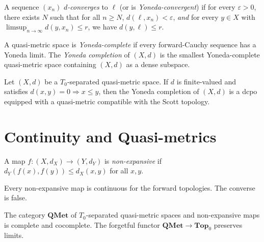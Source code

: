 \begin{definition}
A sequence $(x_n)$ \emph{$d$-converges} to $\ell$ (or is \emph{Yoneda-convergent}) if for
every $\varepsilon > 0$, there exists $N$ such that for all $n \geq N$,
$d(\ell, x_n) < \varepsilon$, \emph{and} for every $y \in X$ with
$\limsup_{n\to\infty} d(y, x_n) \leq r$, we have $d(y, \ell) \leq r$.
\end{definition}

\begin{definition}
A quasi-metric space is \emph{Yoneda-complete} if every forward-Cauchy sequence has a
Yoneda limit. The \emph{Yoneda completion} of $(X,d)$ is the smallest Yoneda-complete
quasi-metric space containing $(X,d)$ as a dense subspace.
\end{definition}

\begin{theorem}
Let $(X,d)$ be a $T_0$-separated quasi-metric space. If $d$ is finite-valued and satisfies
$d(x,y) = 0 \Rightarrow x \leq y$, then the Yoneda completion of $(X,d)$ is a dcpo
equipped with a quasi-metric compatible with the Scott topology.
\end{theorem}

\section{Continuity and Quasi-metrics}

\begin{definition}
A map $f\colon (X,d_X) \to (Y,d_Y)$ is \emph{non-expansive} if
$d_Y(f(x),f(y)) \leq d_X(x,y)$ for all $x,y$.
\end{definition}

\begin{proposition}
Every non-expansive map is continuous for the forward topologies. The converse is false.
\end{proposition}

\begin{theorem}
The category $\mathbf{QMet}$ of $T_0$-separated quasi-metric spaces and non-expansive maps
is complete and cocomplete. The forgetful functor $\mathbf{QMet} \to \mathbf{Top}_0$
preserves limits.
\end{theorem}

